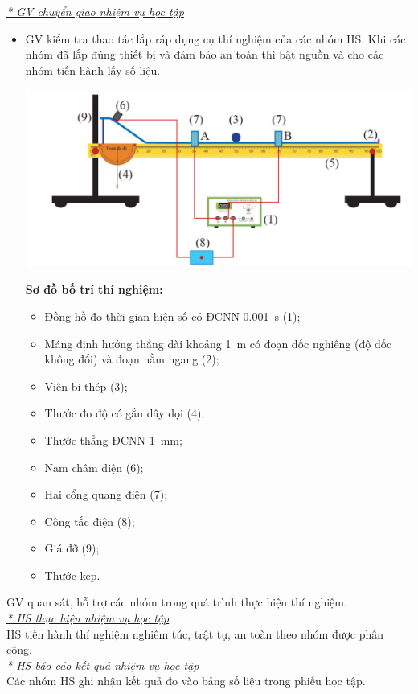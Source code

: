 {\textit{\underline{* GV chuyển giao nhiệm vụ học tập}}
	\begin{itemize}[label=-]
		\item GV kiểm tra thao tác lắp ráp dụng cụ thí nghiệm của các nhóm HS. Khi các nhóm đã lắp đúng thiết bị và đảm bảo an toàn thì bật nguồn và cho các nhóm tiến hành lấy số liệu.\\
		\begin{center}
			\includegraphics[scale=0.5]{figs/G10-BAI6-5}
		\end{center}
		\textbf{Sơ đồ bố trí thí nghiệm:}
		\begin{itemize}[label=$\bullet$]
			\item Đồng hồ đo thời gian hiện số có ĐCNN \SI{0.001}{\second} (1);
			\item Máng định hướng thẳng dài khoảng \SI{1}{\meter} có đoạn dốc nghiêng (độ dốc không đổi) và đoạn nằm ngang (2);
			\item Viên bi thép (3);
			\item Thước đo độ có gắn dây dọi (4);
			\item Thước thẳng ĐCNN \SI{1}{\milli\meter};
			\item Nam châm điện (6);
			\item Hai cổng quang điện (7);
			\item Công tắc điện (8);
			\item Giá đỡ (9);
			\item Thước kẹp.
		\end{itemize}
	\end{itemize}
	GV quan sát, hỗ trợ các nhóm trong quá trình thực hiện thí nghiệm.\\
	\textit{\underline{* HS thực hiện nhiệm vụ học tập}}\\
	HS tiến hành thí nghiệm nghiêm túc, trật tự, an toàn theo nhóm được phân công.\\
	\textit{\underline{* HS báo cáo kết quả nhiệm vụ học tập}}\\
	Các nhóm HS ghi nhận kết quả đo vào bảng số liệu trong phiếu học tập.
	
}

